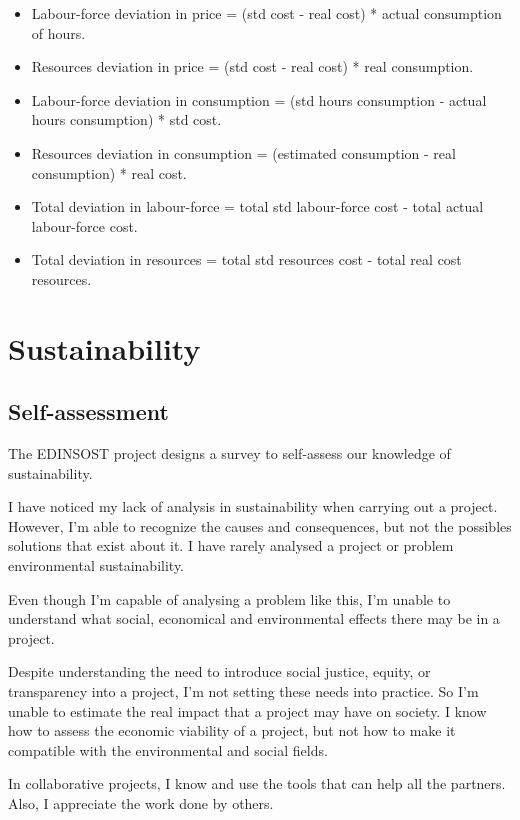\documentclass[titlepage,12pt]{report}
\begin{document}
\begin{itemize}

	\item Labour-force deviation in price = (std cost - real cost) * actual consumption of hours.
	\item Resources deviation in price = (std cost - real cost) * real consumption.
	\item Labour-force deviation in consumption = (std hours consumption - actual hours consumption) * std cost.
	\item Resources deviation in consumption = (estimated consumption - real consumption) * real cost.
	\item Total deviation in labour-force = total std labour-force cost - total actual labour-force cost.
	\item Total deviation in resources = total std resources cost - total real cost resources.

\end{itemize}


\section{Sustainability}

\subsection{Self-assessment}

The EDINSOST project designs a survey to self-assess our knowledge of sustainability.

I have noticed my lack of analysis in sustainability when carrying out a project. However, I'm able to recognize the causes and consequences, but not the possibles solutions that exist about it. I have rarely analysed a project or problem environmental sustainability.

Even though I'm capable of analysing a problem like this, I'm unable to understand what social, economical and environmental effects there may be in a project.

Despite understanding the need to introduce social justice, equity, or transparency into a project, I'm not setting these needs into practice. So I'm unable to estimate the real impact that a project may have on society. I know how to assess the economic viability of a project, but not how to make it compatible with the environmental and social fields.

In collaborative projects, I know and use the tools that can help all the partners.  Also, I appreciate the work done by others.
\end{document}
